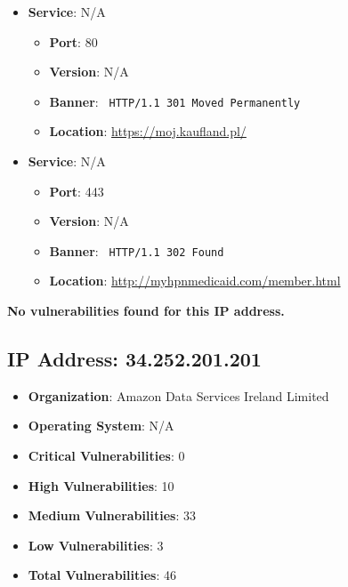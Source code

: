 \documentclass{article}
\begin{document}
\begin{itemize}
    
        \item \textbf{Service}: N/A
        \begin{itemize}
            \item \textbf{Port}: 80
            \item \textbf{Version}:  N/A 
            \item \textbf{Banner}: \texttt{
                HTTP/1.1 301 Moved Permanently
            }
            \item \textbf{Location}: \href{ https://moj.kaufland.pl/ }{ https://moj.kaufland.pl/ }
        \end{itemize}
    
        \item \textbf{Service}: N/A
        \begin{itemize}
            \item \textbf{Port}: 443
            \item \textbf{Version}:  N/A 
            \item \textbf{Banner}: \texttt{
                HTTP/1.1 302 Found
            }
            \item \textbf{Location}: \href{ http://myhpnmedicaid.com/member.html }{ http://myhpnmedicaid.com/member.html }
        \end{itemize}
    
\end{itemize}


\textbf{No vulnerabilities found for this IP address.}




\clearpage



\subsection*{IP Address: 34.252.201.201}

\begin{itemize}
    \item \textbf{Organization}: Amazon Data Services Ireland Limited
    \item \textbf{Operating System}:  N/A 
    \item \textbf{Critical Vulnerabilities}: 0
    \item \textbf{High Vulnerabilities}: 10
    \item \textbf{Medium Vulnerabilities}: 33
    \item \textbf{Low Vulnerabilities}: 3
    \item \textbf{Total Vulnerabilities}: 46
\end{itemize}
\end{document}
